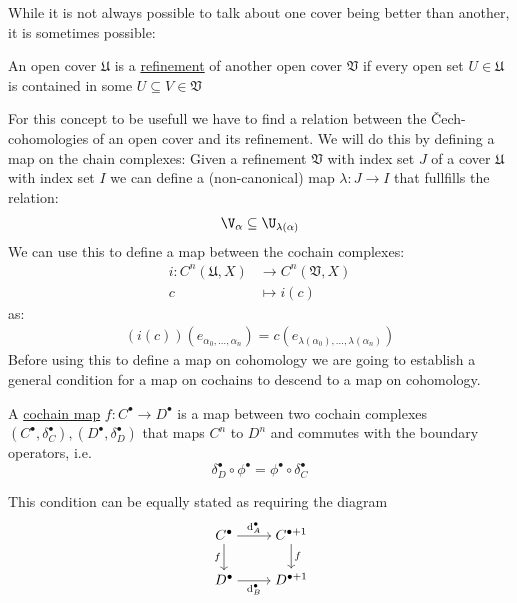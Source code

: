 While it is not always possible to talk about one cover being better than another, it is sometimes possible:
\begin{definition}
An open cover $\mathfrak{U}$ is a \underline{refinement} of another open cover
$\mathfrak{V}$ if every open set $U \in \mathfrak{U}$ is contained in some
$U \subseteq V \in \mathfrak{V}$
\end{definition}
For this concept to be usefull we have to find a relation between the Čech-cohomologies of an open cover
and its refinement. We will do this by defining a map on the chain complexes: Given a
refinement $\mathfrak{V}$ with index set $J$ of a cover $\mathfrak{U}$ with index set $I$ we
can define a (non-canonical) map
$\lambda: J \to I$ that fullfills the relation:
\begin{align*}
	\V_\alpha \subseteq \U_{\lambda(\alpha)}
\end{align*}
We can use this to define a map between the cochain complexes:
\begin{align*}
	i: C^n(\mathfrak{U}, X) &\to C^n(\mathfrak{V}, X) \\
		c &\mapsto i(c)
\end{align*}
as:
\begin{align*}
	(i(c))(e_{\alpha_0, \dots, \alpha_n}) = c(e_{\lambda(\alpha_0), \dots, \lambda(\alpha_n)})
\end{align*}
Before using this to define a map on cohomology we are going to establish a general
condition for a map on cochains to descend to a map on cohomology. 
\begin{definition}
A \underline{cochain map} $f: C^\bullet \to D^\bullet$ is a map between two
cochain complexes
$(C^\bullet, \delta_C^\bullet), (D^\bullet, \delta_D^\bullet)$ that maps
$C^n$ to $D^n$ and commutes with the boundary operators, i.e.
\[
	\delta_D^\bullet \circ \phi^\bullet
	=
	\phi^\bullet \circ \delta_C^\bullet
\]
\end{definition}
This condition can be equally stated as requiring the diagram
\[\begin{tikzcd}[cramped]
	{C^\bullet} & {C^{{\bullet} + 1}} \\
	{D^\bullet} & {D^{{\bullet} + 1}}
	\arrow["{\mathrm{d}_A^\bullet}", from=1-1, to=1-2]
	\arrow["f"', from=1-1, to=2-1]
	\arrow["f", from=1-2, to=2-2]
	\arrow["{\mathrm{d}_B^\bullet}"', from=2-1, to=2-2]
\end{tikzcd}\]
